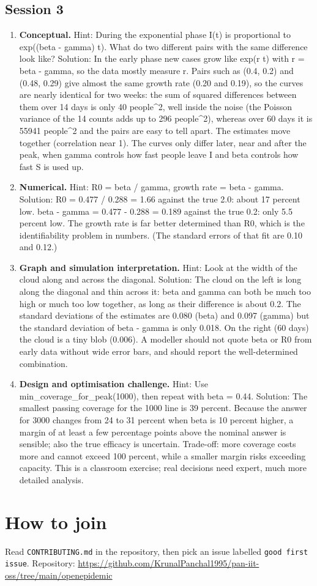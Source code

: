 \documentclass[11pt,a4paper]{article}
\begin{document}
\subsection*{Session 3}
\begin{enumerate}[nosep]
\item \textbf{Conceptual.} Hint: During the exponential phase I(t) is proportional to exp((beta - gamma) t). What do two different pairs with the same difference look like? Solution: In the early phase new cases grow like exp(r t) with r = beta - gamma, so the data mostly measure r. Pairs such as (0.4, 0.2) and (0.48, 0.29) give almost the same growth rate (0.20 and 0.19), so the curves are nearly identical for two weeks: the sum of squared differences between them over 14 days is only 40 people\textasciicircum{}2, well inside the noise (the Poisson variance of the 14 counts adds up to 296 people\textasciicircum{}2), whereas over 60 days it is 55941 people\textasciicircum{}2 and the pairs are easy to tell apart. The estimates move together (correlation near 1). The curves only differ later, near and after the peak, when gamma controls how fast people leave I and beta controls how fast S is used up.
\item \textbf{Numerical.} Hint: R0 = beta / gamma, growth rate = beta - gamma. Solution: R0 = 0.477 / 0.288 = 1.66 against the true 2.0: about 17 percent low. beta - gamma = 0.477 - 0.288 = 0.189 against the true 0.2: only 5.5 percent low. The growth rate is far better determined than R0, which is the identifiability problem in numbers. (The standard errors of that fit are 0.10 and 0.12.)
\item \textbf{Graph and simulation interpretation.} Hint: Look at the width of the cloud along and across the diagonal. Solution: The cloud on the left is long along the diagonal and thin across it: beta and gamma can both be much too high or much too low together, as long as their difference is about 0.2. The standard deviations of the estimates are 0.080 (beta) and 0.097 (gamma) but the standard deviation of beta - gamma is only 0.018. On the right (60 days) the cloud is a tiny blob (0.006). A modeller should not quote beta or R0 from early data without wide error bars, and should report the well-determined combination.
\item \textbf{Design and optimisation challenge.} Hint: Use min\_coverage\_for\_peak(1000), then repeat with beta = 0.44. Solution: The smallest passing coverage for the 1000 line is 39 percent. Because the answer for 3000 changes from 24 to 31 percent when beta is 10 percent higher, a margin of at least a few percentage points above the nominal answer is sensible; also the true efficacy is uncertain. Trade-off: more coverage costs more and cannot exceed 100 percent, while a smaller margin risks exceeding capacity. This is a classroom exercise; real decisions need expert, much more detailed analysis.
\end{enumerate}

\section{How to join}
Read \texttt{CONTRIBUTING.md} in the repository, then pick an issue labelled \texttt{good first issue}. Repository: \url{https://github.com/KrunalPanchal1995/pan-iit-oss/tree/main/openepidemic}
\end{document}
